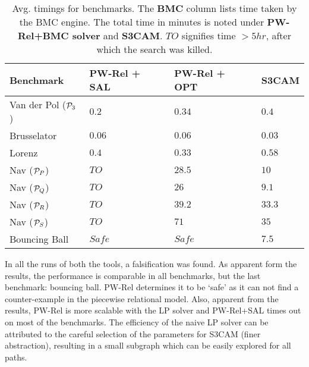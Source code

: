 \begin{table}[!htbp]
\centering
\caption{Avg. timings for benchmarks. The \textbf{BMC} column lists
time taken by the BMC engine. The total time in minutes is noted under
    \textbf{PW-Rel+BMC solver} and \textbf{S3CAM}.
$TO$ signifies time $>5hr$, after which the search was killed.}
\label{tab:res-rel}
\begin{tabular}{@{}llll@{}}
\toprule
    Benchmark & PW-Rel + SAL & PW-Rel + OPT & S3CAM\\
\midrule
    Van der Pol ($\mathcal{P}_3$)   &$0.2$ & $0.34$ & $0.4$\\
    Brusselator               &$0.06$ & $0.06$ & $0.03$\\
    Lorenz                    &$0.4$ & $0.33$ & $0.58$\\
    Nav ($\mathcal{P}_P$)           &$TO$ & $28.5$  & $10$ \\%
    Nav ($\mathcal{P}_Q$)           &$TO$ & $26$   & $9.1$ \\%
    Nav ($\mathcal{P}_R$)           &$TO$ & $39.2$  & $33.3$\\
    Nav ($\mathcal{P}_S$)           &$TO$ & $71$  & $35$\\
    Bouncing Ball             &$Safe$ & $Safe$  & $7.5$\\


\bottomrule
\end{tabular}
\end{table}


In all the runs of both the tools, a falsification was found. As
apparent form the results, the performance is comparable in all
benchmarks, but the last benchmark: bouncing ball. PW-Rel determines
it to be `safe' as it can not find a counter-example in the piecewise
relational model. Also, apparent from the results, PW-Rel is more
scalable with the LP solver and PW-Rel+SAL times out on most of the
benchmarks.  The efficiency of the naive LP solver can be attributed
to the careful selection of the parameters for S3CAM (finer
abstraction), resulting in a small subgraph which can be easily
explored for all paths.

